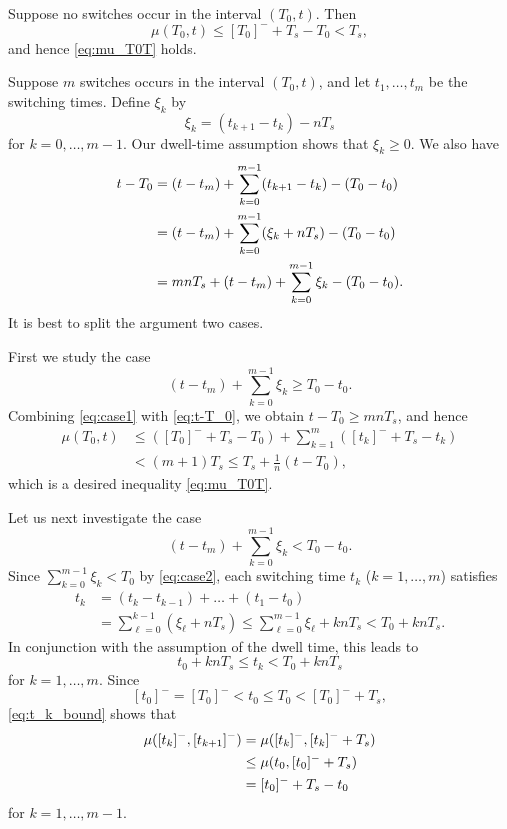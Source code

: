 \documentclass[a4, 11pt]{article}
\begin{document}
Suppose no switches occur in the interval $(T_0, t)$.
Then
\begin{equation*}
\mu(T_0, t) \leq [T_0]^- +T_s - T_0 < T_s,
\end{equation*}
and hence \eqref{eq:mu_T0T} holds.

Suppose $m$ switches occurs in the interval $(T_0, t)$, and let
$t_1,\dots,t_m$ be the switching times.
Define $\xi_k$ by
\begin{equation}
\label{eq:xi_def}
\xi_k = (t_{k+1} - t_k ) - nT_s
\end{equation}
for $k=0,\dots,m-1$.
Our dwell-time assumption shows that $\xi_k \geq 0$.
We also have
\begin{align}
t - T_0 &= 
(t - t_m) + \sum_{k=0}^{m-1}(t_{k+1} - t_{k}) - (T_0 - t_0) \notag \\
&=
(t - t_m) + \sum_{k=0}^{m-1}(\xi_{k} + nT_s) - (T_0 - t_0) \notag\\
&=
mnT_s + (t-t_m) + \sum_{k=0}^{m-1}\xi_{k} - (T_0 -t_0).
\label{eq:t-T_0}
\end{align}
It is best to split the argument two cases.

First we study the case
\begin{equation}
\label{eq:case1}
(t-t_m) + \sum_{k=0}^{m-1}\xi_k \geq T_0 -t_0.
\end{equation}
Combining \eqref{eq:case1} with \eqref{eq:t-T_0}, 
we obtain $t-T_0 \geq mnT_s$, and hence
\begin{align*}
\mu(T_0, t) &\leq  ([T_0]^-+T_s - T_0)
+ \sum_{k=1}^{m} ([t_k]^-+T_s - t_k) \\
&< (m+1)T_s \leq T_s + \frac{1}{n}(t-T_0),
\end{align*}
which is a desired inequality \eqref{eq:mu_T0T}.

Let us next investigate the case
\begin{equation}
\label{eq:case2}
(t-t_m) + \sum_{k=0}^{m-1}\xi_k < T_0 -t_0.
\end{equation}
Since $\sum_{k = 0}^{m-1}\xi_{k} < T_0$ by \eqref{eq:case2},
each switching time $t_k$ ($k=1,\dots,m$) satisfies
\begin{align*}
t_k &= (t_k - t_{k-1}) + \dots + (t_1 - t_0) \\
&= \sum_{\ell = 0}^{k-1} (\xi_{\ell} + nT_s)
\leq  \sum_{\ell = 0}^{m-1}\xi_{\ell} + knT_s 
< T_0 + knT_s.
\end{align*}
In conjunction with the assumption of the dwell time, 
this leads to
\begin{equation}
\label{eq:t_k_bound}
t_0+knT_s \leq t_k < T_0+knT_s
\end{equation}
for $k=1,\dots,m$. 
Since 
\begin{equation}
\label{eq:t0-T0}
[t_0]^- = [T_0]^- < t_0 \leq T_0 < [T_0]^- + T_s, 
\end{equation}
\eqref{eq:t_k_bound} shows that
\begin{align}
\mu([t_k]^-, [t_{k+1}]^-) 
&=
\mu([t_k]^-, [t_k]^-+T_s) \notag \\
&\leq
\mu(t_0, [t_0]^-+T_s) \notag \\
&=
[t_0]^- +T_s - t_0
\label{eq:t_k-t_k+1_bound}
\end{align}
for $k = 1,\dots,m-1$.
\end{document}
